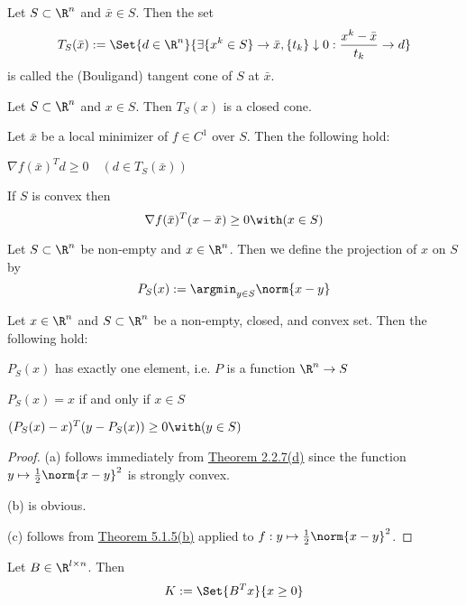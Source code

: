 
Let $S\subset\R^n$ and $\bar x\in S$. Then the set
$$
	T_S(\bar x):=\Set{d\in\R^n}
	{\exists\{x^k\in S\}\to\bar x,\{t_k\}\downarrow0:\frac{x^k-\bar x}{t_k}\to d}
$$
is called the (Bouligand) tangent cone of $S$ at $\bar x$.


Let $S\subset\R^n$ and $x\in S$. Then $T_S(x)$ is a closed cone.

\label{c8e5836}

Let $\bar x$ be a local minimizer of $f\in C^1$ over $S$. Then the following hold:
\begin{enumerata}
	\item $\nabla f(\bar x)^Td\geq0\quad(d\in T_S(\bar x))$
	\item If $S$ is convex then
	$$
		\nabla f(\bar x)^T(x-\bar x)\geq 0\with(x\in S)
	$$
\end{enumerata}


Let $S\subset\R^n$ be non-empty and $x\in\R^n$. Then we define the
projection of $x$ on $S$ by
$$
	P_S(x):=\argmin_{y\in S}\norm{x-y}
$$

\label{ce30ae7}

Let $x\in\R^n$ and $S\subset\R^n$ be a non-empty, closed, and convex
set. Then the following hold:
\begin{enumerata}
	\item $P_S(x)$ has exactly one element, i.e. $P$ is a function
	$\R^n\to S$
	\item $P_S(x)=x$ if and only if $x\in S$
	\item $(P_S(x)-x)^T(y-P_S(x))\geq0\with(y\in S)$
\end{enumerata}

\begin{proof}
	(a) follows immediately from \href{f546fc9}{Theorem 2.2.7(d)} since
	the function $y\mapsto\frac12\norm{x-y}^2$ is strongly convex.

	(b) is obvious.

	(c) follows from \href{c8e5836}{Theorem 5.1.5(b)} applied to
	$f:y\mapsto\frac12\norm{x-y}^2$.
\end{proof}

\label{d2dff14}

Let $B\in\R^{l\times n}$. Then
$$
	K:=\Set{B^Tx}{x\geq0}
$$

